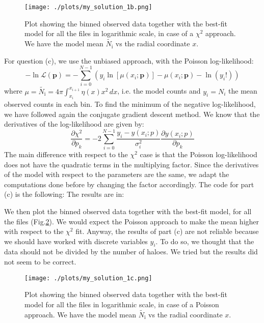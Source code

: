 \begin{figure}[h!]
    \centering
    \texttt{[image: ./plots/my\_solution\_1b.png]}
    \caption{Plot showing the binned observed data together with the best-fit model for all the files in logarithmic scale, in case of a $\chi^2$ approach. We have the model mean $\tilde{N_\text{i}}$ vs the radial coordinate $x$.}
    \label{fig:fig_b}
  \end{figure}

For question (c), we use the unbiased approach, with the Poisson log-likelihood:
\[ -\ln \mathcal{L}(\mathbf{p}) = -\sum_{i=0}^{N-1} \left( y_i \ln[\mu(x_i; \mathbf{p})] - \mu(x_i; \mathbf{p}) - \ln(y_i!) \right) \]
where $\mu = \tilde{N_\text{i}} =  4\pi \int_{x_i}^{x_{i+1}} \eta(x) x^2 \, dx $, i.e. the model counts and $y_i = N_i$ the mean observed counts in each bin. 
To find the minimum of the negative log-likelihood, we have followed again the conjugate gradient descent method.
We know that the derivatives of the log-likelihood are given by:
\[ \frac{\partial \chi^2}{\partial p_k} = -2 \sum_{i=0}^{N-1} \frac{y_i - y(x_i; p)}{\sigma_i^2} \frac{\partial y(x_i; p)}{\partial p_k}\]
The main difference with respect to the $\chi^2$ case is that the Poisson log-likelihood does not have the quadratic terms in the multiplying factor.
Since the derivatives of the model with respect to the parameters are the same, we adapt the computations done before by changing the factor accordingly.
The code for part (c) is the following: 
The results are in: 

We then plot the binned observed data together with the best-fit model, for all the files (Fig.\ref{fig:fig_c}).  We would expect the Poisson approach to make the mean higher with respect to the $\chi^2$ fit.
Anyway, the results of part (c) are not reliable because we should have worked with discrete variables $y_i$. To do so, we thought that the data should not be divided by the number of haloes. We tried but 
the results did not seem to be correct.

\begin{figure}[h!]
    \centering
    \texttt{[image: ./plots/my\_solution\_1c.png]}
    \caption{Plot showing the binned observed data together with the best-fit model for all the files in logarithmic scale, in case of a Poisson approach. We have the model mean $\tilde{N_\text{i}}$ vs the radial coordinate $x$.}
    \label{fig:fig_c}
  \end{figure}

